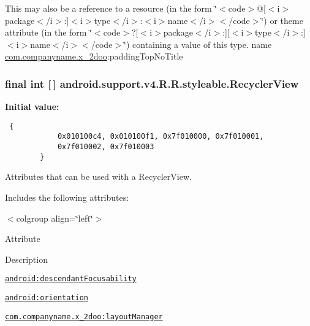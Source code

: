 This may also be a reference to a resource (in the form \char`\"{}$<$code$>$@\mbox{[}$<$i$>$package$<$/i$>$:\mbox{]}$<$i$>$type$<$/i$>$:$<$i$>$name$<$/i$>$$<$/code$>$\char`\"{}) or theme attribute (in the form \char`\"{}$<$code$>$?\mbox{[}$<$i$>$package$<$/i$>$:\mbox{]}\mbox{[}$<$i$>$type$<$/i$>$:\mbox{]}$<$i$>$name$<$/i$>$$<$/code$>$\char`\"{}) containing a value of this type.  name \hyperlink{namespacecom_1_1companyname_1_1x__2doo}{com.companyname.x\_\-2doo}:paddingTopNoTitle \hypertarget{classandroid_1_1support_1_1v4_1_1_r_1_1styleable_2cdeae02a2aae8e03f8765ed3a43caf5}{
\subsubsection[{RecyclerView}]{\setlength{\rightskip}{0pt plus 5cm}final int \mbox{[}$\,$\mbox{]} android.support.v4.R.R.styleable.RecyclerView}}
\label{classandroid_1_1support_1_1v4_1_1_r_1_1styleable_2cdeae02a2aae8e03f8765ed3a43caf5}


\textbf{Initial value:}

\begin{Code}\begin{verbatim} {
            0x010100c4, 0x010100f1, 0x7f010000, 0x7f010001,
            0x7f010002, 0x7f010003
        }
\end{verbatim}
\end{Code}
Attributes that can be used with a RecyclerView. 

Includes the following attributes: \begin{TabularC}{0}
\hline
\end{TabularC}
$<$colgroup align=\char`\"{}left\char`\"{}$>$ 

Attribute

Description 

{\tt \hyperlink{classandroid_1_1support_1_1v4_1_1_r_1_1styleable_08c04653d12c32cd2312f55a2e1e68a9}{android:descendantFocusability}}

{\tt \hyperlink{classandroid_1_1support_1_1v4_1_1_r_1_1styleable_e008924d6df8616aad567584258f56bf}{android:orientation}}

{\tt \hyperlink{classandroid_1_1support_1_1v4_1_1_r_1_1styleable_fb053f97984703efea988f5a33cc13a8}{com.companyname.x\_\-2doo:layoutManager}}

